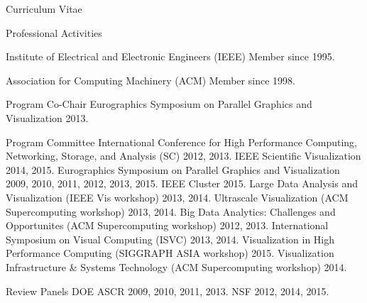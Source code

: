 \documentclass{article}
\begin{document}
\begin{cv}{Curriculum Vitae}
    \begin{cvlist}{Professional Activities}
    \item[Institute of Electrical and Electronic Engineers (IEEE)]
      Member since 1995.
    \item[Association for Computing Machinery (ACM)]  Member since 1998.
    \item[Program Co-Chair] Eurographics Symposium on Parallel Graphics and
      Visualization 2013.
    \item[Program Committee]
      International Conference for High Performance Computing, Networking,
      Storage, and Analysis (SC) 2012, 2013.
      IEEE Scientific Visualization 2014, 2015.
      Eurographics Symposium on Parallel Graphics and Visualization 2009,
      2010, 2011, 2012, 2013, 2015.
      IEEE Cluster 2015.
      Large Data Analysis and Visualization (IEEE Vis workshop) 2013, 2014.
      Ultrascale Visualization (ACM Supercomputing workshop) 2013, 2014.
      Big Data Analytics: Challenges and Opportunites (ACM Supercomputing
      workshop) 2012, 2013.
      International Symposium on Visual Computing (ISVC) 2013, 2014.
      Visualization in High Performance Computing (SIGGRAPH ASIA workshop)
      2015.
      Visualization Infrastructure \& Systems Technology (ACM
      Supercomputing workshop) 2014.
    \item[Review Panels]
      DOE ASCR 2009, 2010, 2011, 2013.
      NSF 2012, 2014, 2015.
    \end{cvlist}

  \end{cv}
\end{document}
